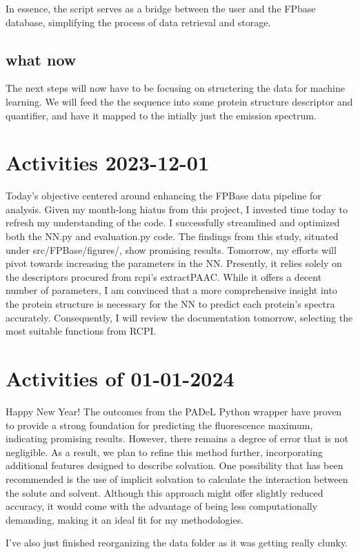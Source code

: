 \documentclass{article}
\begin{document}
In essence, the script serves as a bridge between the user and the FPbase database, simplifying the process of data retrieval and storage.

\subsection{what now}
The next steps will now have to be focusing on structering the data for machine learning. We will feed the the sequence into some protein structure descriptor and quantifier, and have it mapped to the intially just the emission spectrum.


\section{Activities 2023-12-01}
Today's objective centered around enhancing the FPBase data pipeline for analysis. Given my month-long hiatus from this project, I invested time today to refresh my understanding of the code. I successfully streamlined and optimized both the NN.py and evaluation.py code. The findings from this study, situated under src/FPBase/figures/, show promising results. Tomorrow, my efforts will pivot towards increasing the parameters in the NN. Presently, it relies solely on the descriptors procured from rcpi's extractPAAC. While it offers a decent number of parameters, I am convinced that a more comprehensive insight into the protein structure is necessary for the NN to predict each protein's spectra accurately. Consequently, I will review the documentation tomorrow, selecting the most suitable functions from RCPI.

\section{Activities of 01-01-2024}
Happy New Year! The outcomes from the PADeL Python wrapper have proven to provide a strong foundation for predicting the fluorescence maximum, indicating promising results. However, there remains a degree of error that is not negligible. As a result, we plan to refine this method further, incorporating additional features designed to describe solvation. One possibility that has been recommended is the use of implicit solvation to calculate the interaction between the solute and solvent. Although this approach might offer slightly reduced accuracy, it would come with the advantage of being less computationally demanding, making it an ideal fit for my methodologies.

I've also just finished reorganizing the data folder as it was getting really clunky.
\end{document}
